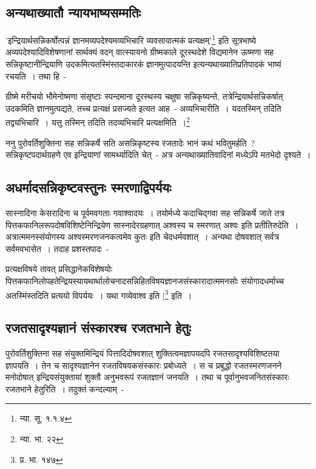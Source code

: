 		\subsection{अन्यथाख्यातौ न्यायभाष्यसम्मतिः}

		'इन्द्रियार्थसन्निकर्षोत्पन्नं ज्ञानमव्यपदेश्यमव्यभिचारि व्यवसायात्मकं प्रत्यक्षम्'\footnote{न्या. सू. १.१.४} इति सूत्रभाष्ये अव्यपदेश्यादिविशेषणानां सार्थक्यं वदन् वात्स्यायनो ग्रीष्मकाले दूरस्थदेशे विद्यमानेन ऊष्मणा सह सन्निकृष्टानीन्द्रियाणि उदकमित्यतस्मिंस्तदाकारकं ज्ञानमुत्पादयन्ति इत्यन्यथाख्यातिप्रतिपादकं भाष्यं रचयति~। तथा हि~-

		{\fontsize{11.7}{0}\selectfont\s ग्रीष्मे मरीचयो भौमेनोष्मणा संसृष्टाः स्पन्दमाना दूरस्थस्य चक्षुषा सन्निकृष्यन्ते, तत्रेन्द्रियार्थसन्निकर्षात् उदकमिति ज्ञानमुत्पद्यते, तच्च प्रत्यक्षं प्रसज्यते इत्यत आह~- अव्यभिचारीति~। यदतस्मिन् तदिति तद्व्यभिचारि~। यत्तु तस्मिन् तदिति तदव्यभिचारि प्रत्यक्षमिति~।\footnote{न्या. भा. २२}}

		ननु पुरोवर्तिशुक्तिना सह सन्निकर्षे सति असन्निकृष्टस्य रजतादेः भानं कथं भवितुमर्हति~? सन्निकृष्टपदार्थग्रहणे एव इन्द्रियाणां सामर्थ्यादिति चेत्~- अत्र अन्यथाख्यातिवादिनां मध्येऽपि मतभेदो दृश्यते~।

		\subsection{अधर्मादसन्निकृष्टवस्तुनः स्मरणाद्विपर्ययः}

		सास्नादिना केसरादिना च पूर्वमवगताः गवाश्वादयः‌~। तयोर्मध्ये कदाचिद्गवा सह सन्निकर्षे जाते तत्र पित्तकफानिलरूपदोषविशिष्टेनिन्द्रियेण सास्नादेरग्रहणात् अश्वस्य च स्मरणात् अश्वः इति प्रतीतिरुदेति~। अत्रात्ममनस्संयोगस्य अश्वस्मरणजनकत्वमेव कुतः इति चेदधर्मवशात्~। अन्यथा दोषवशात् सर्वत्र सर्वमवभासेत~। तदाह प्रशस्तपादः~-

		{\fontsize{11.7}{0}\selectfont\s प्रत्यक्षविषये तावत् प्रसिद्धानेकविशेषयोः पित्तकफानिलोपहतेन्द्रियस्यायथार्थालोचनादसन्निहितविषयज्ञानजसंस्कारादात्ममनसोः संयोगादधर्माच्च अतस्मिंस्तदिति प्रत्ययो विपर्ययः~। यथा गव्येवाश्व इति |\footnote{प्र. भा. १४७} इति~।}

		\subsection{रजतसादृश्यज्ञानं संस्कारश्च रजतभाने हेतुः}

		पुरोवर्तिशुक्तिना सह संयुक्तमिन्द्रियं पित्तादिदोषवशात् शुक्तित्वमज्ञापयदपि रजतसादृश्यविशिष्टतया ज्ञापयति~। तेन च सादृश्यज्ञानेन रजतविषयकसंस्कारः प्रबोध्यते~। स च प्रबुद्धो रजतस्मरणजनने मनोदोषात् इन्द्रियसंयुक्तायां शुक्तौ अनुभवरूपं रजतज्ञानं जनयति~। तथा च पूर्वानुभवजनितसंस्कारः रजतभाने हेतुरिति~। तदुक्तं कन्दल्याम्~- 


